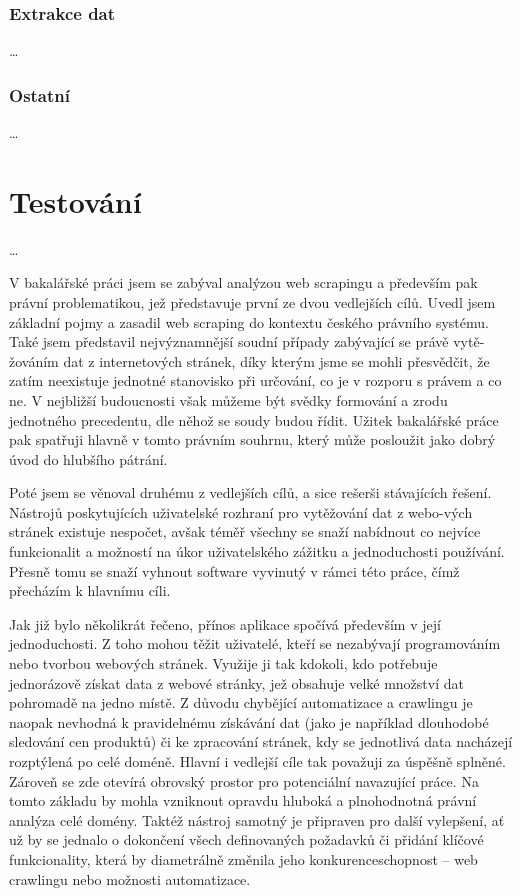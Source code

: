 \documentclass[thesis=B,czech]{FITthesis}[2012/06/26]
\begin{document}
\subsection{Extrakce dat}
\dots

\subsection{Ostatní}
\dots


\chapter{Testování}
\dots


\begin{conclusion}
	\vfill
	V bakalářské práci jsem se zabýval analýzou web scrapingu a především pak právní problematikou, jež představuje první ze dvou vedlejších cílů. Uvedl jsem základní pojmy a zasadil web scraping do kontextu českého právního systému. Také jsem představil nejvýznamnější soudní případy zabývající se právě vytě-žováním dat z internetových stránek, díky kterým jsme se mohli přesvědčit, že zatím neexistuje jednotné stanovisko při určování, co je v rozporu s právem a co ne. V nejbližší budoucnosti však můžeme být svědky formování a zrodu jednotného precedentu, dle něhož se soudy budou řídit. Užitek bakalářské práce pak spatřuji hlavně v tomto právním souhrnu, který může posloužit jako dobrý úvod do hlubšího pátrání.
	
	Poté jsem se věnoval druhému z vedlejších cílů, a sice rešerši stávajících řešení. Nástrojů poskytujících uživatelské rozhraní pro vytěžování dat z webo-vých stránek existuje nespočet, avšak téměř všechny se snaží nabídnout co nejvíce funkcionalit a možností na úkor uživatelského zážitku a jednoduchosti používání. Přesně tomu se snaží vyhnout software vyvinutý v rámci této práce, čímž přecházím k hlavnímu cíli.
	
	Jak již bylo několikrát řečeno, přínos aplikace spočívá především v její jednoduchosti. Z toho mohou těžit uživatelé, kteří se nezabývají programováním nebo tvorbou webových stránek. Využije ji tak kdokoli, kdo potřebuje jednorázově získat data z webové stránky, jež obsahuje velké množství dat pohromadě na jedno místě. Z důvodu chybějící automatizace a crawlingu je naopak nevhodná k pravidelnému získávání dat (jako je například dlouhodobé sledování cen produktů) či ke zpracování stránek, kdy se jednotlivá data nacházejí rozptýlená po celé doméně.
	\newpage
	Hlavní i vedlejší cíle tak považuji za úspěšně splněné. Zároveň se zde otevírá obrovský prostor pro potenciální navazující práce. Na tomto základu by mohla vzniknout opravdu hluboká a plnohodnotná právní analýza celé domény. Taktéž nástroj samotný je připraven pro další vylepšení, ať už by se jednalo o dokončení všech definovaných požadavků či přidání klíčové funkcionality, která by diametrálně změnila jeho konkurenceschopnost -- web crawlingu nebo možnosti automatizace.
\end{conclusion}
\end{document}
